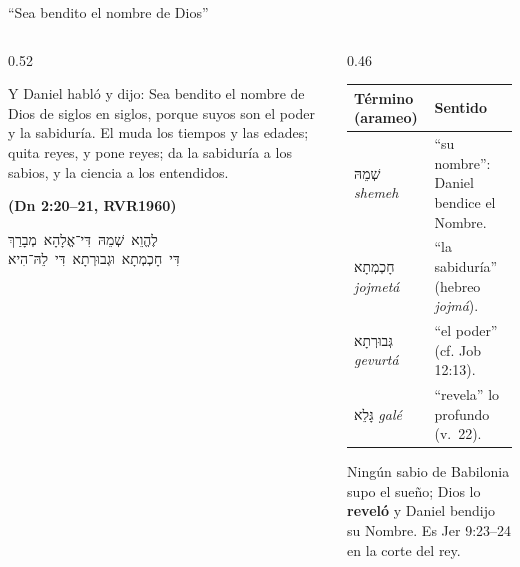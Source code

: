 \documentclass[hyperref={bookmarks=false},aspectratio=169]{beamer}
\newcommand{\heb}[1]{\mbox{\foreignlanguage{hebrew}{#1}}}
\newcommand{\fuente}[1]{\par\hfill{\upshape\bfseries\footnotesize\textcolor{azul}{#1}}}
\newcommand{\destacar}[1]{\textbf{\textcolor{azul}{#1}}}
\begin{document}
\begin{frame}{``Sea bendito el nombre de Dios''}
\begin{columns}[c,onlytextwidth]
\begin{column}{0.52\textwidth}
\begin{cita}Y Daniel habló y dijo: Sea bendito el nombre de Dios de siglos en siglos, porque suyos son el poder y la sabiduría. El muda los tiempos y las edades; quita reyes, y pone reyes; da la sabiduría a los sabios, y la ciencia a los entendidos.\fuente{(Dn 2:20--21, RVR1960)}\end{cita}
\begin{center}\small\heb{לֶהֱוֵא שְׁמֵהּ דִּי־אֱלָהָא מְבָרַךְ}\\ \heb{דִּי חָכְמְתָא וּגְבוּרְתָא דִּי לֵהּ־הִיא}\end{center}
\end{column}
\begin{column}{0.46\textwidth}\scriptsize
\renewcommand{\arraystretch}{1.2}
\begin{tabular}{@{}>{\RaggedRight\arraybackslash}p{1.8cm}>{\RaggedRight\arraybackslash}p{3.8cm}@{}}
\toprule
\textbf{Término (arameo)} & \textbf{Sentido} \\ \midrule
\heb{שְׁמֵהּ} \emph{shemeh} & ``su nombre'': Daniel bendice el Nombre. \\
\heb{חָכְמְתָא} \emph{jojmetá} & ``la sabiduría'' (hebreo \emph{jojmá}). \\
\heb{גְּבוּרְתָא} \emph{gevurtá} & ``el poder'' (cf. Job 12:13). \\
\heb{גָּלֵא} \emph{galé} & ``revela'' lo profundo (v.~22). \\
\bottomrule
\end{tabular}\par\medskip
\small Ningún sabio de Babilonia supo el sueño; Dios lo \destacar{reveló} y Daniel bendijo su Nombre. Es Jer 9:23--24 en la corte del rey.
\end{column}
\end{columns}
\end{frame}
\end{document}
